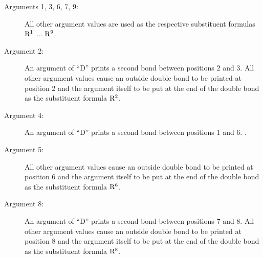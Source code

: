  \begin{description}
 \item[{\rm Arguments 1, 3, 6, 7, 9:}] \rhq
      All other argument values are used as the respective
      substituent formulas ${\rm R^1}$ $\ldots$ ${\rm R^9}$.
 \item[{\rm Argument 2:}] An argument of ``D'' prints
      a second bond between positions 2 and 3. All other
      argument values cause an outside double bond to be
      printed at position 2 and the argument itself to be put
      at the end of the double bond as the substituent formula
      ${\rm R^2}$.
 \item[{\rm Argument 4:}] An argument of ``D'' prints
      a second bond between positions 1 and 6. \rii .
 \item[{\rm Argument 5:}] \rhq  All other argument
      values cause an outside double bond to be printed at
      position 6 and the argument itself to be put at the end
      of the double bond as the substituent formula
      ${\rm R^6}$.
 \item[{\rm Argument 8:}] An argument of ``D'' prints
      a second bond between positions 7 and 8. All other
      argument values cause an outside double bond to be
      printed at position 8 and the argument itself to be put
      at the end of the double bond as the substituent
      formula ${\rm R^8}$.
 \end{description}
 
 
